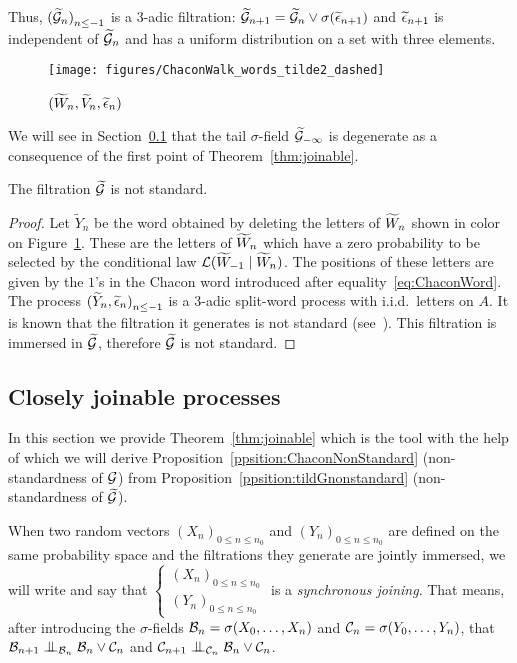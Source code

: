 \documentclass[12pt,a4paper]{article}
\begin{document}
Thus, ${(\widetilde{\mathcal{G}}_n)}_{n \leq -1}$ is a $3$-adic filtration: 
$\widetilde{\mathcal{G}}_{n+1} = \widetilde{\mathcal{G}}_n \vee \sigma(\widetilde{\epsilon}_{n+1})$ and 
$\widetilde{\epsilon}_{n+1}$ is independent of $\widetilde{\mathcal{G}}_n$ and has a uniform distribution 
on a set with three elements. 


\begin{figure}[!h]
\centering
	\texttt{[image: figures/ChaconWalk\_words\_tilde2\_dashed]}
\caption{$(\widetilde{W}_n, \widetilde{V}_n, \widetilde{\epsilon}_n)$}
\label{fig:tildeWn}
\end{figure}

We will see in Section~\ref{sec:joinable} that the tail $\sigma$-field 
$\widetilde{\mathcal{G}}_{-\infty}$ is degenerate as a consequence of the first point of Theorem~\ref{thm:joinable}.

\begin{ppsition}\label{ppsition:tildGnonstandard}
The filtration $\widetilde{\mathcal{G}}$ is not standard. 
\end{ppsition}

\begin{proof}
Let $\widetilde{Y}_n$ be the word obtained by deleting the letters of $\widetilde{W}_n$ 
shown in color on Figure~\ref{fig:tildeWn}. 
These are the letters of $\widetilde{W}_n$ which have a zero probability to be selected 
by the conditional law ${\cal L}(\widetilde{W}_{-1} \mid \widetilde{W}_n)$. 
The positions of these letters are given by the $1$'s in the Chacon word 
introduced after equality~\eqref{eq:ChaconWord}. 
The process ${(\widetilde{Y}_n, \widetilde{\epsilon}_n)}_{n \leq -1}$ is a $3$-adic 
split-word process with i.i.d.\ letters on $A$. 
It is known that the filtration it generates is not standard 
(see~\cite{Ceil, LauXLIII, LauXLV}). 
This filtration is immersed in $\widetilde{\mathcal{G}}$, therefore $\widetilde{\mathcal{G}}$ is not standard.
\end{proof}


\subsection{Closely joinable processes}\label{sec:joinable}

In this section we provide Theorem~\ref{thm:joinable} which is the tool 
with the help of which we will derive Proposition~\ref{ppsition:ChaconNonStandard} 
(non-standardness of $\mathcal{G}$) from Proposition~\ref{ppsition:tildGnonstandard} 
(non-standardness of $\widetilde{\mathcal{G}}$).


When two random vectors 
${(X_n)}_{0 \leq n \leq n_0}$ and ${(Y_n)}_{0 \leq n \leq n_0}$ are defined 
on the same probability space and the filtrations they generate are 
jointly immersed, we will write and say that 
$\left\{\begin{smallmatrix} {(X_n)}_{0 \leq n \leq n_0} \\ 
{(Y_n)}_{0 \leq n \leq n_0}
\end{smallmatrix}\right.$  is a \emph{synchronous joining}. 
That means, after introducing the $\sigma$-fields 
$\mathcal{B}_n = \sigma(X_{0}, \ldots, X_n)$ and  
$\mathcal{C}_n = \sigma(Y_{0}, \ldots, Y_n)$, that 
$\BB_{n+1} \indep_{\BB_n} \BB_n \vee \CC_n$ 
and $\CC_{n+1} \indep_{\CC_n} \BB_n \vee \CC_n$.  
\end{document}
